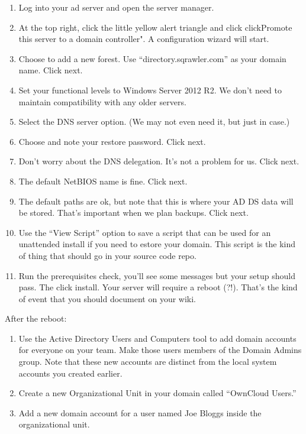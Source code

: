\documentclass{article}
\begin{document}
\begin{enumerate}
	\item Log into your ad server and open the server manager.
	\item At the top right, click the little yellow alert triangle and click clickPromote this server to a domain controller". A configuration wizard will start.
	\item Choose to add a new forest. Use ``directory.sqrawler.com'' as your domain name. Click next.
	\item Set your functional levels to Windows Server 2012 R2. We don't need to maintain compatibility with any older servers.
	\item Select the DNS server option. (We may not even need it, but just in case.)
	\item Choose and note your restore password. Click next.
	\item Don't worry about the DNS delegation. It's not a problem for us. Click next.
	\item The default NetBIOS name is fine. Click next.
	\item The default paths are ok, but note that this is where your AD DS data will be stored. That's important when we plan backups. Click next.
	\item Use the ``View Script'' option to save a script that can be used for an unattended install if you need to estore your domain. This script is the kind of thing that should go in your source code repo.
	\item Run the prerequisites check, you'll see some messages but your setup should pass. The click install.  Your server will require a reboot (?!). That's the kind of event that you should document on your wiki.
\end{enumerate}

After the reboot:
\begin{enumerate}
	\item Use the Active Directory Users and Computers tool to add domain accounts for everyone on your team.  Make those users members of the Domain Admins group. Note that these new accounts are distinct from the local system accounts you created earlier.
	\item Create a new Organizational Unit in your domain called ``OwnCloud  Users.''
	\item Add a new domain account for a user named Joe Bloggs inside the organizational unit.
\end{enumerate}
\end{document}
